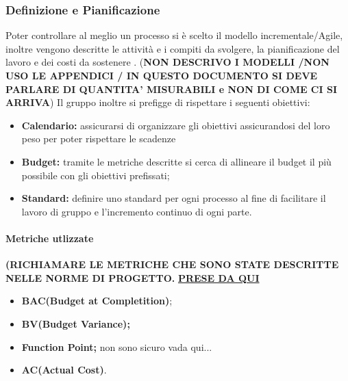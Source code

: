 \subsubsection{Definizione e Pianificazione}
Poter controllare al meglio un processo si è scelto il modello incrementale/Agile, inoltre vengono descritte le attività e i compiti da svolgere, la pianificazione del lavoro e dei costi da sostenere . (\textbf{NON DESCRIVO I MODELLI /NON USO LE APPENDICI / IN QUESTO DOCUMENTO SI DEVE PARLARE DI QUANTITA' MISURABILI e NON DI COME CI SI ARRIVA}) Il gruppo inoltre si prefigge di rispettare i seguenti obiettivi:
\begin{itemize}
		\item{\textbf{Calendario:} assicurarsi di organizzare gli obiettivi assicurandosi del loro peso per poter rispettare le scadenze}
		\item{\textbf{Budget:} tramite le metriche descritte si cerca di allineare il budget il più possibile con gli obiettivi prefissati;}
		\item{\textbf{Standard:} definire uno standard per ogni processo al fine di facilitare il lavoro di gruppo e l'incremento continuo di ogni parte.}
\end{itemize} 
\paragraph{Metriche utlizzate}
\textbf{(RICHIAMARE LE METRICHE CHE SONO STATE DESCRITTE NELLE NORME DI PROGETTO.}
\href{https://it.wikipedia.org/wiki/Metriche_di_progetto}{\textbf{PRESE DA QUI}}
\begin{itemize}
	\item{\textbf{BAC(Budget at Completition)};}
	\item{\textbf{BV(Budget Variance);}}
	\item{\textbf{Function Point;} non sono sicuro vada qui...}
	\item{\textbf{AC(Actual Cost)}.}
\end{itemize}
\begin{table}[!htpb]
\end{table}

